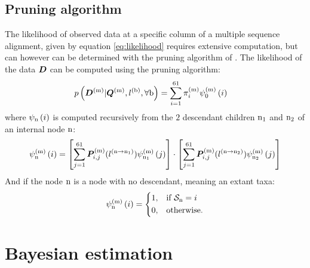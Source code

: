 \subsection{Pruning algorithm}
The \gls{likelihood} of observed data at a specific column of a multiple sequence alignment, given by equation \ref{eq:likelihood} requires extensive computation, but can however can be determined with the pruning algorithm of \citet{Felsenstein1985}.
The \gls{likelihood} of the data $\bm{D}$ can be computed using the pruning algorithm:
\begin{align}
    p\left(\bm{D}^{(\text{m})}| \bm{Q}^{(\text{m})}, l^{(\text{b})}, \forall \text{b} \right) & = \sum\limits_{{i}=1}^{61} \pi^{(\text{m})}_{{i}} \psi^{(\text{m})}_{0} \left( {i} \right)
\end{align}
where $\psi_{\text{n}} \left( {i} \right)$ is computed recursively from the $2$ descendant children $\text{n}_{1}$ and $\text{n}_{2}$ of an internal node $\text{n}$:
\begin{align}
    \psi^{(\text{m})}_{\text{n}} \left( {i} \right) =
    \left[ \sum\limits_{{j}=1}^{61}\bm{P}^{(\text{m})}_{{i}, {j}}(l^{(\text{n} \to \text{n}_{1})}) \psi^{(\text{m})}_{\text{n}_{1}} \left( {j} \right) \right]
    \cdot
    \left[ \sum\limits_{{j}=1}^{61}\bm{P}^{(\text{m})}_{{i}, {j}}(l^{(\text{n} \to \text{n}_{2})}) \psi^{(\text{m})}_{\text{n}_{2}} \left( {j} \right) \right]
\end{align}
And if the node $\text{n}$ is a node with no descendant, meaning an extant taxa:
\begin{align}
    \psi^{(\text{m})}_{\text{n}} \left( {i} \right) =
    \begin{dcases}
        1, & \text{if } \mathcal{S}_{\text{n}} = {i} \\
        0, & \text{otherwise.}
    \end{dcases}
\end{align}


\section{Bayesian estimation}
\label{sec:intro-bayesian}

